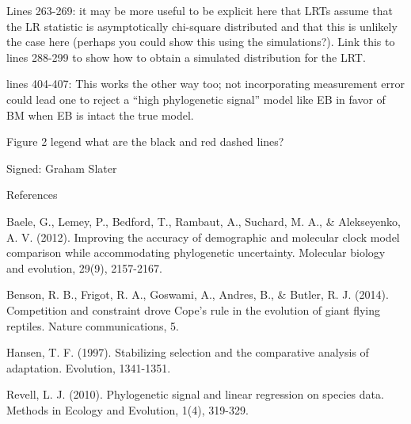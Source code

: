 \documentclass[11pt]{letter}
\begin{document}
\begin{letter}{}
Lines 263-269: it may be more useful to be explicit here that LRTs assume that the LR statistic is asymptotically chi-square distributed and that this is unlikely the case here (perhaps you could show this using the simulations?). Link this to lines 288-299 to show how to obtain a simulated distribution for the LRT.

lines 404-407: This works the other way too; not incorporating measurement error could lead one to reject a “high phylogenetic signal” model like EB in favor of BM when EB is intact the true model.


Figure 2 legend what are the black and red dashed lines?

Signed: Graham Slater

References

Baele, G., Lemey, P., Bedford, T., Rambaut, A., Suchard, M. A., & Alekseyenko, A. V. (2012). Improving the accuracy of demographic and molecular clock model comparison while accommodating phylogenetic uncertainty. Molecular biology and evolution, 29(9), 2157-2167.


Benson, R. B., Frigot, R. A., Goswami, A., Andres, B., & Butler, R. J. (2014). Competition and constraint drove Cope's rule in the evolution of giant flying reptiles. Nature communications, 5.

Hansen, T. F. (1997). Stabilizing selection and the comparative analysis of adaptation. Evolution, 1341-1351.

Revell, L. J. (2010). Phylogenetic signal and linear regression on species data. Methods in Ecology and Evolution, 1(4), 319-329.



\end{letter}
\end{document}

